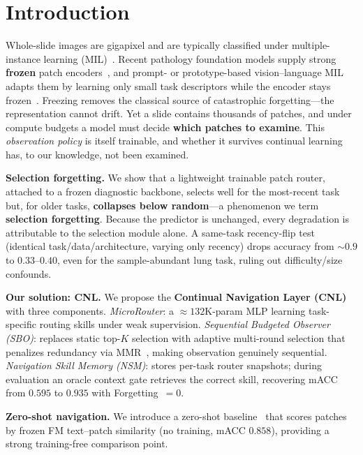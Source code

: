 \documentclass[runningheads]{llncs}
\begin{document}
\section{Introduction}
\label{sec:intro}

Whole-slide images are gigapixel and are typically classified under
multiple-instance learning (MIL)~\cite{ilse2018abmil,lu2021clam}.
Recent pathology foundation models supply strong \textbf{frozen} patch
encoders~\cite{lu2024conch,chen2024uni}, and prompt- or
prototype-based vision--language MIL adapts them by learning only
small task descriptors while the encoder stays
frozen~\cite{gou2025qpmil}. Freezing removes the classical source of
catastrophic forgetting---the representation cannot drift. Yet a slide
contains thousands of patches, and under compute budgets a model must
decide \textbf{which patches to examine}. This \emph{observation
policy} is itself trainable, and whether it survives continual
learning has, to our knowledge, not been examined.

\noindent\textbf{Selection forgetting.} We show that a lightweight
trainable patch router, attached to a frozen diagnostic backbone,
selects well for the most-recent task but, for older tasks,
\textbf{collapses below random}---a phenomenon we term \textbf{selection
forgetting}. Because the predictor is unchanged, every degradation is
attributable to the selection module alone. A same-task recency-flip
test (identical task/data/architecture, varying only recency) drops
accuracy from ${\sim}0.9$ to $0.33$--$0.40$, even for the
sample-abundant lung task, ruling out difficulty/size confounds.

\noindent\textbf{Our solution: CNL.} We propose the \textbf{Continual
Navigation Layer (CNL)} with three components. \emph{MicroRouter}: a
${\approx}132$K-param MLP learning task-specific routing skills under
weak supervision. \emph{Sequential Budgeted Observer (SBO)}: replaces
static top-$K$ selection with adaptive multi-round selection that
penalizes redundancy via MMR~\cite{carbonell1998mmr}, making
observation genuinely sequential. \emph{Navigation Skill Memory
(NSM)}: stores per-task router snapshots; during evaluation an oracle
context gate retrieves the correct skill, recovering mACC from $0.595$
to $\mathbf{0.935}$ with Forgetting~$=0$.

\noindent\textbf{Zero-shot navigation.} We introduce a zero-shot
baseline~\cite{zeroslide} that scores patches by frozen FM text--patch
similarity (no training, mACC $0.858$), providing a strong
training-free comparison point.
\end{document}
